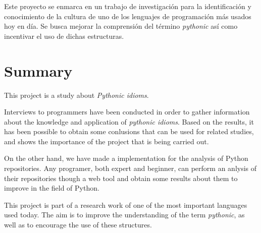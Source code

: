 \documentclass[a4paper, 12pt]{book}
\begin{document}
Este proyecto se enmarca en un trabajo de investigación para la identificación y conocimiento de la cultura de uno de los lenguajes de programación más usados hoy en día. Se busca mejorar la comprensión del término \textit{pythonic} así como incentivar el uso de dichas estructuras. 




\chapter*{Summary}

This project is a study about \textit{Pythonic idioms}.

Interviews to programmers have been conducted in order to gather information about the knowledge and application of \textit{pythonic idioms}. Based on the results, it has been possible to obtain some conlusions that can be used for related studies, and shows the importance of the project that is being carried out.

On the other hand, we have made a implementation for the analysis of Python repositories. Any programer, both expert and beginner, can perform an anlysis of their repositories though a web tool and obtain some results about them to improve in the field of Python.

This project is part of a research work of one of the most important languages used today. The aim is to improve the understanding of the term \textit{pythonic}, as well as to encourage the use of these structures.



\tableofcontents 
\cleardoublepage
\listoffigures %
\end{document}
